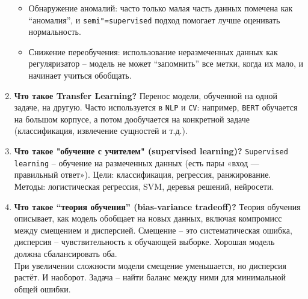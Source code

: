 \documentclass{article}
\begin{document}
\begin{enumerate}
\begin{itemize}
        \item Обнаружение аномалий: часто только малая часть данных помечена как ``аномалия'', и \texttt{semi"=supervised} подход помогает лучше оценивать нормальность.
        \item Снижение переобучения: использование неразмеченных данных как регуляризатор -- модель не может ``запомнить'' все метки, когда их мало, и начинает учиться обобщать.
    \end{itemize}
    \item \textbf{Что такое Transfer Learning?} Перенос модели, обученной на одной задаче, на другую. Часто используется в \texttt{NLP} и \texttt{CV}: например, \texttt{BERT} обучается на большом корпусе, а потом дообучается на конкретной задаче (классификация, извлечение сущностей и т.д.).
    \item \textbf{Что такое "обучение с учителем" (supervised learning)?}
    \texttt{Supervised learning} -- обучение на размеченных данных (есть пары «вход — правильный ответ»). Цели: классификация, регрессия, ранжирование. Методы: логистическая регрессия, SVM, деревья решений, нейросети.
    \item \textbf{Что такое ``теория обучения'' (bias-variance tradeoff)?} Теория обучения описывает, как модель обобщает на новых данных, включая компромисс между смещением и дисперсией. Смещение -- это систематическая ошибка, дисперсия -- чувствительность к обучающей выборке. Хорошая модель должна сбалансировать оба. \\
    При увеличении сложности модели смещение уменьшается, но дисперсия растёт. И наоборот. Задача -- найти баланс между ними для минимальной общей ошибки.
\end{enumerate}
\end{document}

